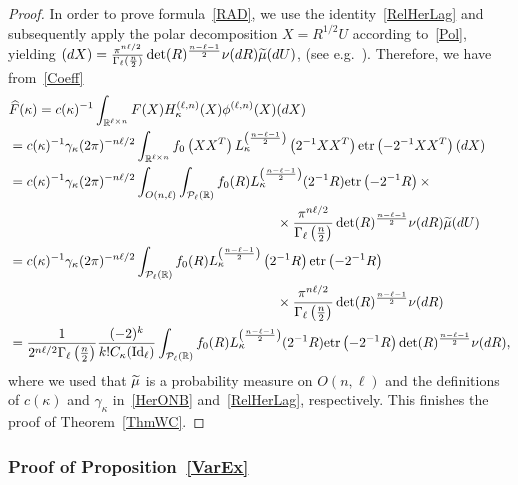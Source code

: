 \documentclass[10pt]{amsart}
\theoremstyle{definition}\newtheorem{defi}[theo]{Definition}\newtheorem{rema}[theo]{Remark}\newtheorem{exam}[theo]{Example}\newtheorem{exem}[theo]{Example}\newtheorem{nota}[theo]{Notation}
\DeclareMathOperator{\Id}{Id}
\newcommand{\clP}{\mathcal{P}}
\newcommand{\R}{\mathbb{R}}
\newcommand{\etr}[1]{\mathrm{etr}\left(#1\right)}
\let\oldtilde\tilde
\renewcommand*{\tilde}[1]{\mathchoice{\widetilde{#1}}{\widetilde{#1}}{\oldtilde{#1}}{\oldtilde{#1}}}
\let\oldhat\hat
\renewcommand*{\hat}[1]{\mathchoice{\widehat{#1}}{\widehat{#1}}{\oldhat{#1}}{\oldhat{#1}}}
\begin{document}
\begin{proof}
In order to prove formula~\eqref{RAD}, we use the identity~\eqref{RelHerLag} and subsequently apply the polar decomposition $X=R^{1/2}U$ according to~\eqref{Pol}, yielding $ (dX) = \frac{\pi^{n\ell/2}}{\Gamma_{\ell}(\frac{n}{2})} \det(R)^{\frac{n-\ell-1}{2}}\nu(dR)\tilde{\mu}(dU)$, (see e.g.~\cite[Theorem~1.5.2]{Ch2012}). Therefore, we have from~\eqref{Coeff}
\begingroup
\allowdisplaybreaks
\begin{align*}
&\hat{F}(\kappa)= c(\kappa)^{-1}\int_{\R^{\ell\times n}} F(X) H_{\kappa}^{(\ell,n)}(X) \phi^{(\ell,n)}(X)(dX) \\
&= c(\kappa)^{-1} \gamma_{\kappa} (2\pi)^{-n\ell/2} \int_{\R^{\ell\times n}} f_0\left(XX^T\right) L_{\kappa}^{\left(\frac{n-\ell-1}{2}\right)}\left(2^{-1}XX^T\right) \etr{-2^{-1}XX^T}(dX)\\
&= c(\kappa)^{-1} \gamma_{\kappa} (2\pi)^{-n\ell/2} \int_{O(n,\ell)}
\int_{\clP_{\ell}(\R)} f_0(R) L_{\kappa}^{\left(\frac{n-\ell-1}{2}\right)}(2^{-1}R) \etr{-2^{-1}R} \times \\
& \hspace{7cm} \times \frac{\pi^{n\ell/2}}{\Gamma_{\ell}\left(\frac{n}{2}\right)} \det(R)^{\frac{n-\ell-1}{2}}\nu(dR)\tilde{\mu}(dU)\\
&=c(\kappa)^{-1} \gamma_{\kappa}(2\pi)^{-n\ell/2}
\int_{\clP_{\ell}(\R)} f_0(R) L_{\kappa}^{\left(\frac{n-\ell-1}{2}\right)}\left(2^{-1}R\right)\etr{-2^{-1}R} \\
&\hspace{7cm}\times \frac{\pi^{n\ell/2}}{\Gamma_{\ell}\left(\frac{n}{2}\right)} \det(R)^{\frac{n-\ell-1}{2}}\nu(dR) \\
&= \frac{1}{2^{n\ell/2}\Gamma_{\ell}\left(\frac{n}{2}\right)}\frac{(-2)^{k}}{k!C_{\kappa}(\Id_{\ell})}\int_{\clP_{\ell}(\R)} f_0(R) L_{\kappa}^{\left(\frac{n-\ell-1}{2}\right)}(2^{-1}R) \etr{-2^{-1}R} \det(R)^{\frac{n-\ell-1}{2}}\nu(dR),
\end{align*}
\endgroup
where we used that $\tilde{\mu}$ is a probability measure on $O(n,\ell)$ and the definitions of $c(\kappa)$ and $\gamma_{\kappa}$ in~\eqref{HerONB} and~\eqref{RelHerLag}, respectively. This finishes the proof of Theorem~\ref{ThmWC}.
\end{proof}

\subsubsection*{Proof of Proposition~\ref{VarEx}}
\end{document}
